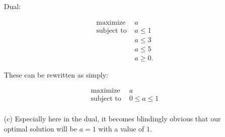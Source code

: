 \documentclass[11pt]{article}
\begin{document}
\begin{problems}
\begin{enumerate}
    Dual:

    \begin{align*}
    \text{maximize } &a\\
    \text{subject to } &a \leq 1\\
    & a \leq 3\\
    &a \leq 5\\
    &a \geq 0.
    \end{align*}

    These can be rewritten as simply:

    \begin{align*}
    \text{maximize } &a\\
    \text{subject to } &0 \leq a \leq 1\\
    \end{align*}

    \smallskip

  \item[(c)] Especially here in the dual, it becomes blindingly obvious that our optimal solution will be $a=1$ with a value of $1$.
  \end{enumerate}

\end{problems}
\end{document}
